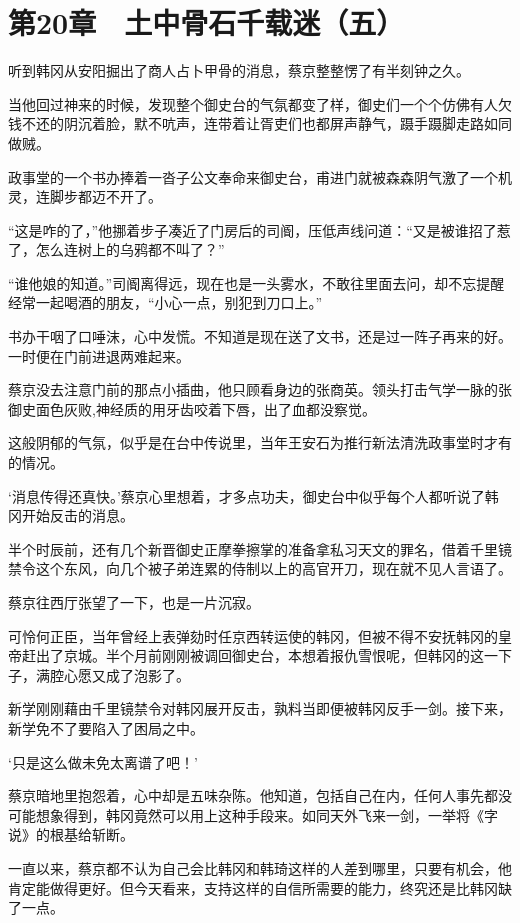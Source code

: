\section{第20章　土中骨石千载迷（五）}

听到韩冈从安阳掘出了商人占卜甲骨的消息，蔡京整整愣了有半刻钟之久。

当他回过神来的时候，发现整个御史台的气氛都变了样，御史们一个个仿佛有人欠钱不还的阴沉着脸，默不吭声，连带着让胥吏们也都屏声静气，蹑手蹑脚走路如同做贼。

政事堂的一个书办捧着一沓子公文奉命来御史台，甫进门就被森森阴气激了一个机灵，连脚步都迈不开了。

“这是咋的了，”他挪着步子凑近了门房后的司阍，压低声线问道：“又是被谁招了惹了，怎么连树上的乌鸦都不叫了？”

“谁他娘的知道。”司阍离得远，现在也是一头雾水，不敢往里面去问，却不忘提醒经常一起喝酒的朋友，“小心一点，别犯到刀口上。”

书办干咽了口唾沫，心中发慌。不知道是现在送了文书，还是过一阵子再来的好。一时便在门前进退两难起来。

蔡京没去注意门前的那点小插曲，他只顾看身边的张商英。领头打击气学一脉的张御史面色灰败,神经质的用牙齿咬着下唇，出了血都没察觉。

这般阴郁的气氛，似乎是在台中传说里，当年王安石为推行新法清洗政事堂时才有的情况。

‘消息传得还真快。’蔡京心里想着，才多点功夫，御史台中似乎每个人都听说了韩冈开始反击的消息。

半个时辰前，还有几个新晋御史正摩拳擦掌的准备拿私习天文的罪名，借着千里镜禁令这个东风，向几个被子弟连累的侍制以上的高官开刀，现在就不见人言语了。

蔡京往西厅张望了一下，也是一片沉寂。

可怜何正臣，当年曾经上表弹劾时任京西转运使的韩冈，但被不得不安抚韩冈的皇帝赶出了京城。半个月前刚刚被调回御史台，本想着报仇雪恨呢，但韩冈的这一下子，满腔心愿又成了泡影了。

新学刚刚藉由千里镜禁令对韩冈展开反击，孰料当即便被韩冈反手一剑。接下来，新学免不了要陷入了困局之中。

‘只是这么做未免太离谱了吧！’

蔡京暗地里抱怨着，心中却是五味杂陈。他知道，包括自己在内，任何人事先都没可能想象得到，韩冈竟然可以用上这种手段来。如同天外飞来一剑，一举将《字说》的根基给斩断。

一直以来，蔡京都不认为自己会比韩冈和韩琦这样的人差到哪里，只要有机会，他肯定能做得更好。但今天看来，支持这样的自信所需要的能力，终究还是比韩冈缺了一点。

